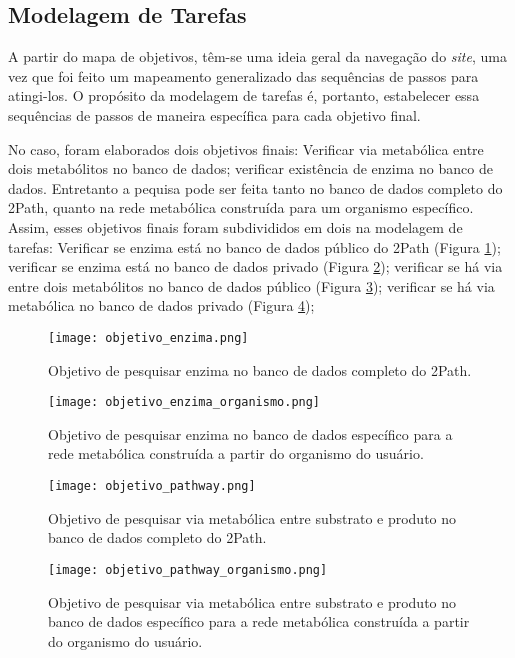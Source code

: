 \subsection{Modelagem de Tarefas}

\indent A partir do mapa de objetivos, têm-se uma ideia geral da navegação do \textit{site}, uma vez que foi feito um mapeamento generalizado das sequências de passos para atingi-los. O propósito da modelagem de tarefas é, portanto, estabelecer essa sequências de passos de maneira específica para cada objetivo final. 

\indent No caso, foram elaborados dois objetivos finais: Verificar via metabólica entre dois metabólitos no banco de dados; verificar existência de enzima no banco de dados. Entretanto a pequisa pode ser feita tanto no banco de dados completo do 2Path, quanto na rede metabólica construída para um organismo específico. Assim, esses objetivos finais foram subdivididos em dois na modelagem de tarefas: Verificar se enzima está no banco de dados público do 2Path (Figura \ref{fig:objetivo_enzyma}); verificar se enzima está no banco de dados privado (Figura \ref{fig:objetivo_enzyma_organismo}); verificar se há via entre dois metabólitos no banco de dados público (Figura \ref{fig:objetivo_pathway}); verificar se há via metabólica no banco de dados privado (Figura \ref{fig:objetivo_pathway_organismo});

\begin{figure}[!h]
    \centering
    \texttt{[image: objetivo\_enzima.png]}
    \caption{Objetivo de pesquisar enzima no banco de dados completo do 2Path.}
    \label{fig:objetivo_enzyma}
\end{figure}

\newpage
\begin{figure}[!h]
    \centering
    \texttt{[image: objetivo\_enzima\_organismo.png]}
    \caption{Objetivo de pesquisar enzima no banco de dados específico para a rede metabólica construída a partir do organismo do usuário.}
    \label{fig:objetivo_enzyma_organismo}
\end{figure}

\begin{figure}[!h]
    \centering
    \texttt{[image: objetivo\_pathway.png]}
    \caption{Objetivo de pesquisar via metabólica entre substrato e produto no banco de dados completo do 2Path.}
    \label{fig:objetivo_pathway}
\end{figure}
\break
\begin{figure}[!h]
    \centering
    \texttt{[image: objetivo\_pathway\_organismo.png]}
    \caption{Objetivo de pesquisar via metabólica entre substrato e produto no banco de dados  específico para a rede metabólica construída a partir do organismo do usuário.}
    \label{fig:objetivo_pathway_organismo}
\end{figure}

